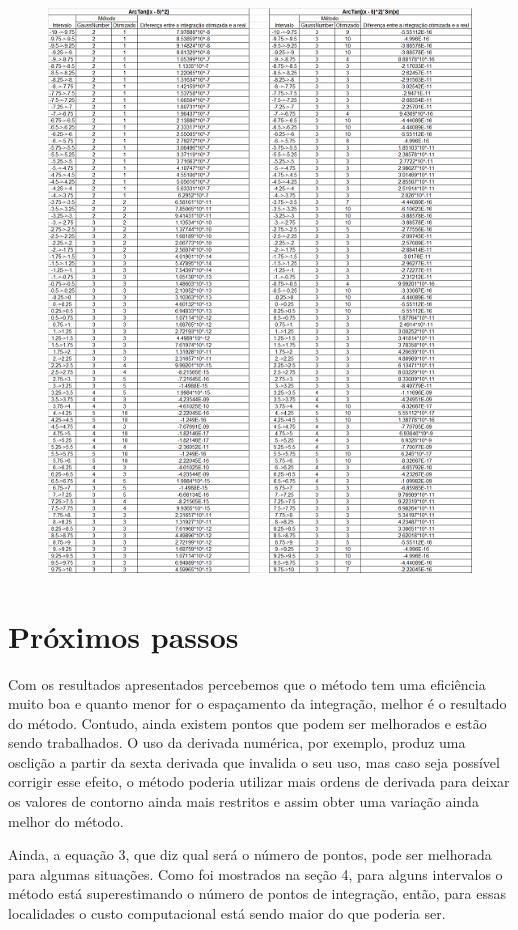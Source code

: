 \documentclass[12pt,a4paper]{article}
\begin{document}
\begin{figure}[H]
\begin{center}
\includegraphics{images/arctan}
\end{center}
\end{figure}


\newpage
\section{Próximos passos}

\qquad Com os resultados apresentados percebemos que o método tem uma eficiência muito boa e quanto menor for o espaçamento da integração, melhor é o resultado do método. Contudo, ainda existem pontos que podem ser melhorados e estão sendo trabalhados. O uso da derivada numérica, por exemplo, produz uma osclição a partir da sexta derivada que invalida o seu uso, mas caso seja possível corrigir esse efeito, o método poderia utilizar mais ordens de derivada para deixar os valores de contorno ainda mais restritos e assim obter uma variação ainda melhor do método.

Ainda, a equação 3, que diz qual será o número de pontos, pode ser melhorada para algumas situações. Como foi mostrados na seção 4, para alguns intervalos o método está superestimando o número de pontos de integração, então, para essas localidades o custo computacional está sendo maior do que poderia ser.
\end{document}
